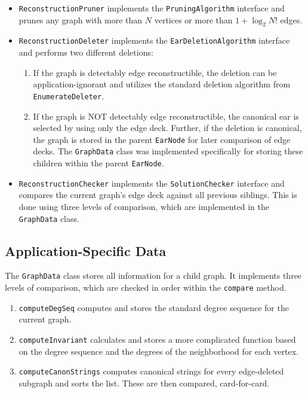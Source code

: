 \documentclass[11pt]{article}
\begin{document}
\begin{itemize}
	\item \texttt{ReconstructionPruner} implements the \texttt{PruningAlgorithm}
		interface
		and prunes any graph with more than $N$ vertices or
		more than $1+ \log_2 N!$ edges.
		
	\item \texttt{ReconstructionDeleter} implements the \texttt{EarDeletionAlgorithm}
		interface
		and performs two different deletions:
		
		\begin{enumerate}
			\item If the graph is detectably edge reconstructible, 
				the deletion can be application-ignorant and utilizes
				the standard deletion algorithm from \texttt{EnumerateDeleter}.
				
			\item If the graph is NOT detectably edge reconstructible,
				the canonical ear is selected by using only the edge deck.
				Further, if the deletion is canonical, the graph is stored 
					in the parent \texttt{EarNode} for later comparison of edge decks.
				The \texttt{GraphData} class was implemented specifically for
					storing these children within the parent \texttt{EarNode}.
		\end{enumerate}	
		
	\item \texttt{ReconstructionChecker} implements the \texttt{SolutionChecker}
		interface and compares the current graph's edge deck against 
		all previous siblings.  This is done using three levels of comparison,
			which are implemented in the \texttt{GraphData} class. 
			
\end{itemize}

\subsection{Application-Specific Data}

The \texttt{GraphData} class stores all information for a child graph.
It implements three levels of comparison, which 
	are checked in order within the \texttt{compare} method.

	\begin{enumerate}
		\item \texttt{computeDegSeq} computes and stores the standard degree sequence for the
			current graph.
			
		\item \texttt{computeInvariant} calculates and stores  a more complicated function 
			based on the degree sequence and the degrees of the neighborhood for 
			each vertex.
			
		\item \texttt{computeCanonStrings} computes canonical strings for every edge-deleted
			subgraph and sorts the list. These are then compared, card-for-card.
	\end{enumerate}
	
\end{document}
